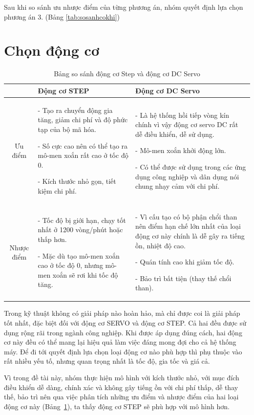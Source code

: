 Sau khi so sánh ưu nhược điểm của từng phương án, nhóm quyết định lựa chọn phương án 3. (Bảng \ref{tab:sosanhcokhi})

\section{Chọn động cơ}
\begin{table}[H]
\centering
\begin{tabular}{|c|p{5.5cm}|p{5.5cm}|}
\hline
 & Động cơ STEP & Động cơ DC Servo \\
\hline 
Ưu điểm & 
- Tạo ra chuyển động gia tăng, giảm chi phí và độ phức tạp của bộ mã hóa.

- Số cực cao nên có thể tạo ra mô-men xoắn rất cao ở tốc độ 0.

- Kích thước nhỏ gọn, tiết kiệm chi phí.
& 
- Là hệ thống hồi tiếp vòng kín chính vì vậy động cơ servo DC rất dễ điều khiển, dễ sử dụng.

- Mô-men xoắn khởi động lớn.

- Có thể được sử dụng trong các ứng dụng công nghiệp và dân dụng nói chung nhạy cảm với chi phí. \\ 
\hline 
Nhược điểm & 
- Tốc độ bị giới hạn, chạy tốt nhất ở 1200 vòng/phút hoặc thấp hơn.

- Mặc dù tạo mô-men xoắn cao ở tốc độ 0, nhưng mô-men xoắn sẽ rơi khi tốc độ tăng.
 & 
- Vì cấu tạo có bộ phận chổi than nên điểm hạn chế lớn nhất của loại động cơ này chính là dễ gây ra tiếng ồn, nhiệt độ cao.

- Quán tính cao khi giảm tốc độ.

- Bảo trì bất tiện (thay thế chổi than). \\ 
\hline 
\end{tabular} 
\caption{Bảng so sánh động cơ Step và động cơ DC Servo}
\label{tab:sosanhdongco}
\end{table}

Trong kỹ thuật không có giải pháp nào hoàn hảo, mà chỉ được coi là giải pháp tốt nhất, đặc biệt đối với động cơ SERVO và động cơ STEP. Cả hai đều được sử dụng rộng rãi trong ngành công nghiệp. Khi được áp dụng đúng cách, hai động cơ này đều có thể mang lại hiệu quả làm việc đáng mong đợi cho cả hệ thống máy. Để đi tới quyết định lựa chọn loại động cơ nào phù hợp thì phụ thuộc vào rất nhiều yếu tố, nhưng quan trọng nhất là tốc độ, gia tốc và giá cả.


Vì trong đề tài này, nhóm thực hiện mô hình với kích thước nhỏ, với mục đích điều khiển dễ dàng, chính xác và không gây tiếng ồn với chi phí thấp, dễ thay thế, bảo trì nên qua việc phân tích những ưu điểm và nhược điểm của hai loại động cơ này (Bảng~\ref{tab:sosanhdongco}), ta thấy động cơ STEP sẽ phù hợp với mô hình hơn.

